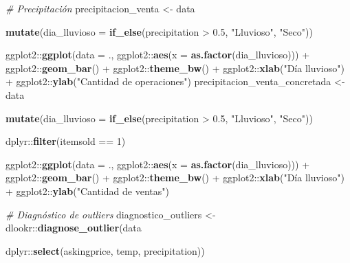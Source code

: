 \documentclass[
  12pt]{article}
\newenvironment{Shaded}{}{}
\newcommand{\CommentTok}[1]{\textcolor[rgb]{0.38,0.63,0.69}{\textit{#1}}}
\newcommand{\DataTypeTok}[1]{\textcolor[rgb]{0.56,0.13,0.00}{#1}}
\newcommand{\DecValTok}[1]{\textcolor[rgb]{0.25,0.63,0.44}{#1}}
\newcommand{\FloatTok}[1]{\textcolor[rgb]{0.25,0.63,0.44}{#1}}
\newcommand{\KeywordTok}[1]{\textcolor[rgb]{0.00,0.44,0.13}{\textbf{#1}}}
\newcommand{\NormalTok}[1]{#1}
\newcommand{\OperatorTok}[1]{\textcolor[rgb]{0.40,0.40,0.40}{#1}}
\newcommand{\StringTok}[1]{\textcolor[rgb]{0.25,0.44,0.63}{#1}}
\begin{document}
\begin{Shaded}
\begin{Highlighting}[]
{{{{{{{{{{\CommentTok{# Precipitación}
\NormalTok{precipitacion_venta <-}\StringTok{ }\NormalTok{data }\OperatorTok{%>%}
\StringTok{  }\KeywordTok{mutate}\NormalTok{(}\DataTypeTok{dia_lluvioso =} \KeywordTok{if_else}\NormalTok{(precipitation }\OperatorTok{>}\StringTok{ }\FloatTok{0.5}\NormalTok{, }\StringTok{"Lluvioso"}\NormalTok{, }\StringTok{"Seco"}\NormalTok{))  }\OperatorTok{%>%}
\StringTok{  }\NormalTok{ggplot2}\OperatorTok{::}\KeywordTok{ggplot}\NormalTok{(}\DataTypeTok{data =}\NormalTok{ ., ggplot2}\OperatorTok{::}\KeywordTok{aes}\NormalTok{(}\DataTypeTok{x =} \KeywordTok{as.factor}\NormalTok{(dia_lluvioso))) }\OperatorTok{+}
\StringTok{  }\NormalTok{ggplot2}\OperatorTok{::}\KeywordTok{geom_bar}\NormalTok{() }\OperatorTok{+}
\StringTok{  }\NormalTok{ggplot2}\OperatorTok{::}\KeywordTok{theme_bw}\NormalTok{() }\OperatorTok{+}
\StringTok{  }\NormalTok{ggplot2}\OperatorTok{::}\KeywordTok{xlab}\NormalTok{(}\StringTok{"Día lluvioso"}\NormalTok{) }\OperatorTok{+}\StringTok{ }\NormalTok{ggplot2}\OperatorTok{::}\KeywordTok{ylab}\NormalTok{(}\StringTok{"Cantidad de operaciones"}\NormalTok{)}
\NormalTok{precipitacion_venta_concretada <-}\StringTok{ }\NormalTok{data }\OperatorTok{%>%}
\StringTok{  }\KeywordTok{mutate}\NormalTok{(}\DataTypeTok{dia_lluvioso =} \KeywordTok{if_else}\NormalTok{(precipitation }\OperatorTok{>}\StringTok{ }\FloatTok{0.5}\NormalTok{, }\StringTok{"Lluvioso"}\NormalTok{, }\StringTok{"Seco"}\NormalTok{))  }\OperatorTok{%>%}
\StringTok{  }\NormalTok{dplyr}\OperatorTok{::}\KeywordTok{filter}\NormalTok{(itemsold }\OperatorTok{==}\StringTok{ }\DecValTok{1}\NormalTok{) }\OperatorTok{%>%}
\StringTok{  }\NormalTok{ggplot2}\OperatorTok{::}\KeywordTok{ggplot}\NormalTok{(}\DataTypeTok{data =}\NormalTok{ ., ggplot2}\OperatorTok{::}\KeywordTok{aes}\NormalTok{(}\DataTypeTok{x =} \KeywordTok{as.factor}\NormalTok{(dia_lluvioso))) }\OperatorTok{+}
\StringTok{  }\NormalTok{ggplot2}\OperatorTok{::}\KeywordTok{geom_bar}\NormalTok{() }\OperatorTok{+}
\StringTok{  }\NormalTok{ggplot2}\OperatorTok{::}\KeywordTok{theme_bw}\NormalTok{() }\OperatorTok{+}
\StringTok{  }\NormalTok{ggplot2}\OperatorTok{::}\KeywordTok{xlab}\NormalTok{(}\StringTok{"Día lluvioso"}\NormalTok{) }\OperatorTok{+}\StringTok{ }\NormalTok{ggplot2}\OperatorTok{::}\KeywordTok{ylab}\NormalTok{(}\StringTok{"Cantidad de ventas"}\NormalTok{)}


\CommentTok{# Diagnóstico de outliers}
\NormalTok{diagnostico_outliers <-}\StringTok{ }\NormalTok{dlookr}\OperatorTok{::}\KeywordTok{diagnose_outlier}\NormalTok{(data }\OperatorTok{%>%}
\StringTok{                                                   }\NormalTok{dplyr}\OperatorTok{::}\KeywordTok{select}\NormalTok{(askingprice, temp, precipitation))}

}}}}}}}}}}}}}}}}
\end{Highlighting}
\end{Shaded}
\end{document}
